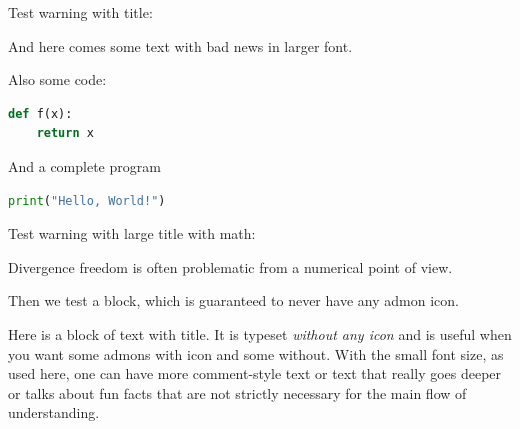 \documentclass[%
oneside,                 %
final,                   %
10pt]{article}
\newenvironment{warningshaded}
{\def\FrameCommand{\fboxsep=3mm\colorbox{yellowicon_warning_background}}
 \MakeFramed {\advance\hsize-\width \FrameRestore}}{\endMakeFramed}
\newenvironment{warning_yellowiconadmon}[1][Warning]{
\begin{warningshaded}
\noindent
\begin{figure}
\vspace{-13pt}
\texttt{[image: latex\_figs/small\_yellow\_warning]}
\end{figure} \textbf{#1}\par
\nobreak\noindent\ignorespaces
}
{
\end{warningshaded}
}
\newenvironment{blockshaded}
{\def\FrameCommand{\fboxsep=3mm\colorbox{yellowicon_block_background}}
 \MakeFramed {\advance\hsize-\width \FrameRestore}}{\endMakeFramed}
\newenvironment{block_yellowiconadmon}[1][Block]{
\begin{blockshaded}
\noindent
 \textbf{#1}\par
\nobreak\noindent\ignorespaces
}
{
\end{blockshaded}
}
\begin{document}
Test warning with title:


\begin{warning_yellowiconadmon}
{\large And here comes some text with bad news in larger font.

Also some code:




\begin{lstlisting}[language=python,style=simple,xleftmargin=2mm]
def f(x):
    return x

\end{lstlisting}

And a complete program



\begin{lstlisting}[language=python,style=simple,xleftmargin=2mm]
print("Hello, World!")

\end{lstlisting}
\par}
\end{warning_yellowiconadmon} %



Test warning with large title with math:


\begin{warning_yellowiconadmon}[{\large Watch out for $\nabla\cdot\bm{u}=0$ equations}]
{\large Divergence freedom is often problematic from a numerical point
of view.
\par}
\end{warning_yellowiconadmon} %



Then we test a block, which is guaranteed to never have any admon icon.


\begin{block_yellowiconadmon}
\vspace{-2.5mm}\par\noindent
{\footnotesize Here is a block of text with title. It is typeset
\emph{without any icon} and is useful when you want some admons with icon
and some without. With the small font size, as used here, one can have
more comment-style text or text that really goes deeper or talks
about fun facts that are not strictly necessary for the main flow
of understanding.
\par}
\end{block_yellowiconadmon} %
\end{document}
